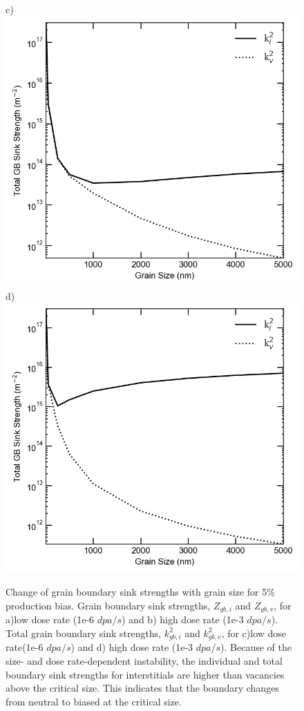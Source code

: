 \documentclass[utf8]{frontiersSCNS} %
\begin{document}
\begin{figure}[h!]
        c)\includegraphics[scale=0.55]{Fig9_c}
        d)\includegraphics[scale=0.55]{Fig9_d}
        \caption{Change of grain boundary sink strengths with grain size for 5\% production bias. Grain boundary sink strengths, $Z_{gb,i}$ and $Z_{gb,v}$, for a)low dose rate (1e-6 $dpa/s$) and b) high dose rate (1e-3 $dpa/s$). Total grain boundary sink strengths, $k_{gb,i}^2$ and $k_{gb,v}^2$, for c)low dose rate(1e-6 $dpa/s$) and d) high dose rate (1e-3 $dpa/s$). Because of the size- and dose rate-dependent instability, the individual and total boundary sink strengths for interstitials are higher than vacancies above the critical size. This indicates that the boundary changes from neutral to biased at the critical size.}
        \label{figure:sink_strengths_neutron_5_1e-6}
    \end{figure}
    
\end{document}
